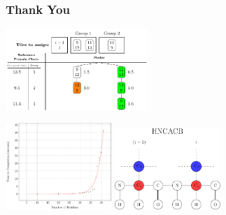 \documentclass{beamer}
\begin{document}
\begin{frame}
	\frametitle{Thank You} 
	\begin{center}
	\includegraphics[width=0.4\textwidth]{graphic/time_line}\hspace{2em}
	\resizebox{!}{.3\paperheight}{}
	\end{center}
	\begin{center}
	\includegraphics[width=0.3\textwidth]{plot}\hspace{2em}
	\includegraphics[width=0.3\textwidth]{diagram}
\end{center}
\end{frame}
\end{document}

